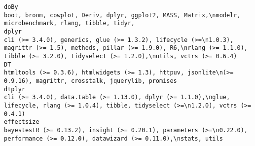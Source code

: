 \documentclass[
  letterpaper,
  DIV=11,
  numbers=noendperiod]{scrreprt}
\begin{document}
\begin{verbatim}
doBy                                                                                                                                                                                                                                                                                                                                                                                                                                                                                                             boot, broom, cowplot, Deriv, dplyr, ggplot2, MASS, Matrix,\nmodelr, microbenchmark, rlang, tibble, tidyr,
dplyr                                                                                                                                                                                                                                                                                                                                                                                                           cli (>= 3.4.0), generics, glue (>= 1.3.2), lifecycle (>=\n1.0.3), magrittr (>= 1.5), methods, pillar (>= 1.9.0), R6,\nrlang (>= 1.1.0), tibble (>= 3.2.0), tidyselect (>= 1.2.0),\nutils, vctrs (>= 0.6.4)
DT                                                                                                                                                                                                                                                                                                                                                                                                                                                                                                     htmltools (>= 0.3.6), htmlwidgets (>= 1.3), httpuv, jsonlite\n(>= 0.9.16), magrittr, crosstalk, jquerylib, promises
dtplyr                                                                                                                                                                                                                                                                                                                                                                                                                                                                      cli (>= 3.4.0), data.table (>= 1.13.0), dplyr (>= 1.1.0),\nglue, lifecycle, rlang (>= 1.0.4), tibble, tidyselect (>=\n1.2.0), vctrs (>= 0.4.1)
effectsize                                                                                                                                                                                                                                                                                                                                                                                                                                                                            bayestestR (>= 0.13.2), insight (>= 0.20.1), parameters (>=\n0.22.0), performance (>= 0.12.0), datawizard (>= 0.11.0),\nstats, utils

\end{verbatim}
\end{document}
